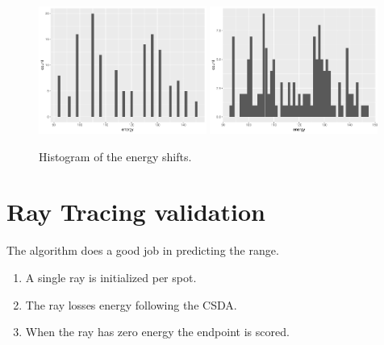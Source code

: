 \documentclass{article}
\begin{document}
\begin{figure}[h]
    \centering
    \includegraphics[width=0.49\textwidth]{energies_original.pdf}
    \includegraphics[width=0.49\textwidth]{energies_adapted.pdf}
    \caption{Histogram of the energy shifts.}
\end{figure}

\section{Ray Tracing validation}

The algorithm does a good job in predicting the range.

\begin{enumerate}
    \item A single ray is initialized per spot.
    \item The ray losses energy following the CSDA.
    \item When the ray has zero energy the endpoint is scored.
\end{enumerate}
\end{document}
